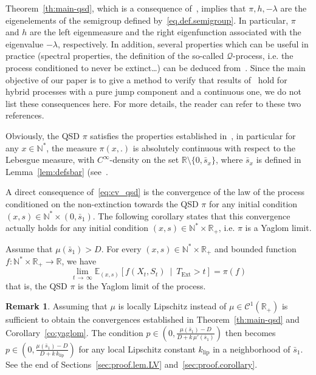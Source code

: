\documentclass[10pt]{amsart}
\theoremstyle{definition}\newtheorem{defi}[theo]{Definition}\newtheorem{rema}[theo]{Remark}\newtheorem{exam}[theo]{Example}\newtheorem{exem}[theo]{Example}\newtheorem{nota}[theo]{Notation}
\newcommand{\RR}{\mathbb{R}}
\newcommand{\NN}{\mathbb{N}}
\newcommand{\EE}{\mathbb{E}}
\newcommand{\clC}{\mathcal{C}}
\newcommand{\clQ}{\mathcal{Q}}
\newcommand{\klip}{k_{\text{lip}}}
\newcommand{\Text}{T_{\mathrm{Ext}}}
\newcommand{\1}{\mathbf{1}}
\begin{document}
Theorem~\ref{th:main-qsd}, which is a consequence of~\cite{CV20,BCGM}, implies that $\pi, h, -\lambda$ are the eigenelements of the semigroup defined by~\eqref{eq.def.semigroup}. In particular, $\pi$ and $h$ are the left eigenmeasure and the right eigenfunction associated with the eigenvalue $-\lambda$, respectively. In addition, several properties which can be useful in practice (spectral properties, the definition of the so-called $\clQ$-process, i.e. the process conditioned to never be extinct\dots\!) can be deduced from~\cite{BCGM,CV20}. Since the main objective of our paper is to give a method to verify that results of~\cite{BCGM,CV20} hold for hybrid processes with a pure jump component and a continuous one, we do not list these consequences here. For more details, the reader can refer to these two references.


Obviously, the QSD $\pi$ satisfies the properties established in~\cite{CMMS}, in particular for any $x\in \NN^*$, the measure $\pi(x,.)$ is absolutely continuous with respect to the Lebesgue measure, with $C^\infty$-density on the set $\RR\setminus\{0,\bar s_x\}$, where $\bar s_x$ is defined in Lemma~\ref{lem:defsbar} (see~\cite[Proposition~5.1]{CMMS}.



A direct consequence of~\eqref{eq:cv_qsd} is the convergence of the law of the process conditioned on the non-extinction towards the QSD $\pi$ for any initial condition $(x,s)\in \NN^*\times (0, \bar s_1)$. The following corollary states that this convergence actually holds for any initial condition $(x,s)\in \NN^* \times \RR_+$, i.e. $\pi$ is a Yaglom limit.

\begin{coro}\label{co:yaglom}
Assume that $\mu(\bar s_1)>D$. For every $(x,s) \in \NN^* \times \RR_+$ and bounded function $f:\NN^*\times \RR_+\to \RR$, we have
\[
\lim_{t\,\to\,\infty} \EE_{(x,s)} \left[f(X_t,S_t) \ \middle| \ \Text>t\right] = \pi(f)
\]
that is, the QSD $\pi$ is the Yaglom limit of the process.
\end{coro}



\begin{rema}\label{remark:mu.lipschitz}
Assuming that $\mu$ is locally Lipschitz instead of $\mu\in \clC^1(\RR_+)$ is sufficient to obtain the convergences established in Theorem~\ref{th:main-qsd} and Corollary~\ref{co:yaglom}. The condition $p\in(0,\frac{\mu(\bar s_1)-D}{D+k\,\mu'(\bar s_1)})$ then becomes $p\in(0,\frac{\mu(\bar s_1)-D}{D+k\,\klip})$ for any local Lipschitz constant $\klip$ in a neighborhood of $\bar s_1$. See the end of Sections~\ref{sec:proof.lem.LV} and~\ref{sec:proof.corollary}.
\end{rema}
\end{document}
